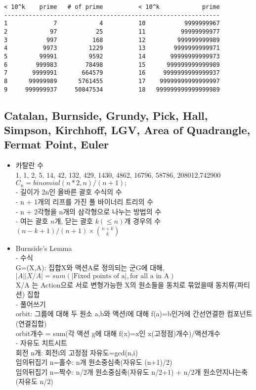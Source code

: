 \documentclass[landscape, 8pt, a4paper, oneside]{extarticle}
\begin{document}
\begin{multicols*}{3}
\begin{verbatim}
< 10^k    prime   # of prime          < 10^k            prime
-------------------------------------------------------------
1             7            4          10           9999999967
2            97           25          11          99999999977
3           997          168          12         999999999989
4          9973         1229          13        9999999999971
5         99991         9592          14       99999999999973
6        999983        78498          15      999999999999989
7       9999991       664579          16     9999999999999937
8      99999989      5761455          17    99999999999999997
9     999999937     50847534          18   999999999999999989
\end{verbatim}

\subsection{Catalan, Burnside, Grundy, Pick, Hall, Simpson, Kirchhoff, LGV, Area of Quadrangle, Fermat Point, Euler}
\begin{itemize}[noitemsep]
    
\item 카탈란 수\\
1, 1, 2, 5, 14, 42, 132, 429, 1430, 4862, 16796, 58786, 208012,742900\\
$C_n = binomial(n * 2, n) / (n + 1);$\\
- 길이가 2n인 올바른 괄호 수식의 수\\
- n + 1개의 리프를 가진 풀 바이너리 트리의 수\\
- n + 2각형을 n개의 삼각형으로 나누는 방법의 수\\
- 여는 괄호 $n$개, 닫는 괄호 $k(\leq n)$개 경우의 수$(n-k+1)/(n+1) \times {n+k \choose k}$

\item Burnside’s Lemma\\
- 수식\\
G=(X,A): 집합X와 액션A로 정의되는 군G에 대해, $\vert A\vert\vert X/A \vert=sum(\vert \text{Fixed points of a}\vert,\text{for all a in A})$\\
X/A 는 Action으로 서로 변형가능한 X의 원소들을 동치로 묶었을때 동치류(파티션) 집합\\
- 풀어쓰기\\
orbit: 그룹에 대해 두 원소 a,b와 액션f에 대해 f(a)=b인거에 간선연결한 컴포넌트(연결집합)\\
orbit개수 = sum(각 액션 g에 대해 f(x)=x인 x(고정점)개수)/액션개수\\
- 자유도 치트시트\\
회전 n개: 회전i의 고정점 자유도=gcd(n,i)\\
임의뒤집기 n=홀수: n개 원소중심축(자유도 (n+1)/2)\\
임의뒤집기 n=짝수: n/2개 원소중심축(자유도 n/2+1) + n/2개 원소안지나는축(자유도 n/2)


\end{itemize}
\end{multicols*}
\end{document}

